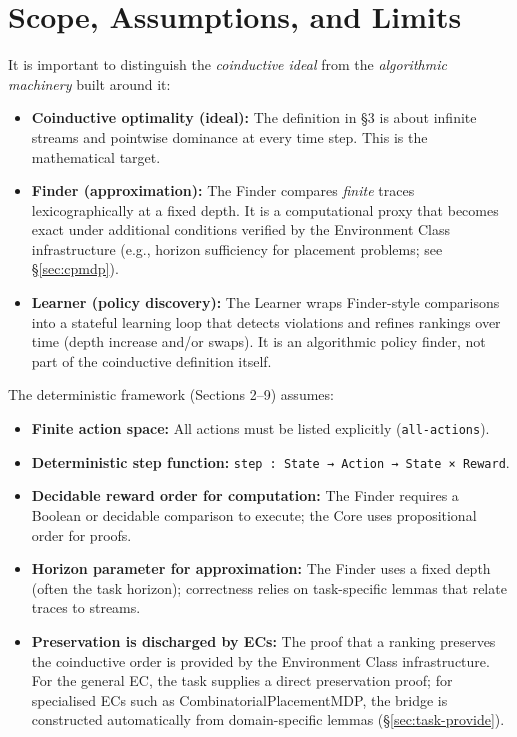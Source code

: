 \documentclass[9pt,a4paper]{article}
\theoremstyle{plain}
\theoremstyle{definition}
\theoremstyle{remark}
\begin{document}
\section{Scope, Assumptions, and Limits}

It is important to distinguish the \emph{coinductive ideal} from the \emph{algorithmic machinery} built around it:
\begin{itemize}
\item \textbf{Coinductive optimality (ideal):} The definition in \S3 is about infinite streams and pointwise dominance at every time step. This is the mathematical target.
\item \textbf{Finder (approximation):} The Finder compares \emph{finite} traces lexicographically at a fixed depth. It is a computational proxy that becomes exact under additional conditions verified by the Environment Class infrastructure (e.g., horizon sufficiency for placement problems; see \S\ref{sec:cpmdp}).
\item \textbf{Learner (policy discovery):} The Learner wraps Finder-style comparisons into a stateful learning loop that detects violations and refines rankings over time (depth increase and/or swaps). It is an algorithmic policy finder, not part of the coinductive definition itself.
\end{itemize}

The deterministic framework (Sections 2--9) assumes:
\begin{itemize}
\item \textbf{Finite action space:} All actions must be listed explicitly (\texttt{all-actions}).
\item \textbf{Deterministic step function:} \texttt{step : State → Action → State × Reward}.
\item \textbf{Decidable reward order for computation:} The Finder requires a Boolean or decidable comparison to execute; the Core uses propositional order for proofs.
\item \textbf{Horizon parameter for approximation:} The Finder uses a fixed depth (often the task horizon); correctness relies on task-specific lemmas that relate traces to streams.
\item \textbf{Preservation is discharged by ECs:} The proof that a ranking preserves the coinductive order is provided by the Environment Class infrastructure. For the general EC, the task supplies a direct preservation proof; for specialised ECs such as CombinatorialPlacementMDP, the bridge is constructed automatically from domain-specific lemmas (\S\ref{sec:task-provide}).
\end{itemize}
\end{document}
